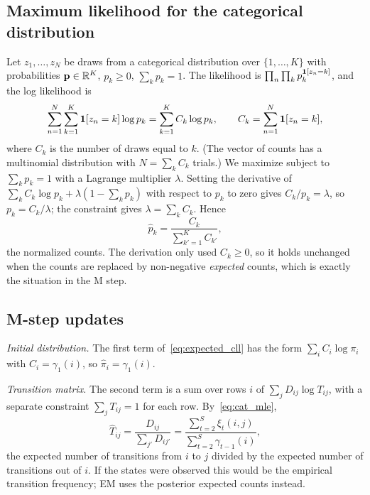 \subsection{Maximum likelihood for the categorical distribution}

Let $z_1,\dots,z_N$ be draws from a categorical distribution over $\{1,\dots,K\}$ with probabilities $\mathbf{p}\in\mathbb{R}^K$, $p_k\geq 0$, $\sum_k p_k=1$. The likelihood is $\prod_n\prod_k p_k^{\mathbf{1}[z_n=k]}$, and the log likelihood is
\begin{equation}
  \sum_{n=1}^N\sum_{k=1}^K\mathbf{1}[z_n=k]\log p_k = \sum_{k=1}^K C_k\log p_k, \qquad C_k = \sum_{n=1}^N\mathbf{1}[z_n=k],
\end{equation}
where $C_k$ is the number of draws equal to $k$. (The vector of counts has a multinomial distribution with $N=\sum_k C_k$ trials.) We maximize subject to $\sum_k p_k=1$ with a Lagrange multiplier $\lambda$. Setting the derivative of $\sum_k C_k\log p_k+\lambda\left(1-\sum_k p_k\right)$ with respect to $p_k$ to zero gives $C_k/p_k=\lambda$, so $p_k=C_k/\lambda$; the constraint gives $\lambda=\sum_k C_k$. Hence
\begin{equation}
  \hat p_k = \frac{C_k}{\sum_{k'=1}^K C_{k'}},
  \label{eq:cat_mle}
\end{equation}
the normalized counts. The derivation only used $C_k\geq 0$, so it holds unchanged when the counts are replaced by non-negative \emph{expected} counts, which is exactly the situation in the M step.

\subsection{M-step updates}

\emph{Initial distribution.} The first term of~\eqref{eq:expected_cll} has the form $\sum_i C_i\log\pi_i$ with $C_i=\gamma_1(i)$, so $\hat\pi_i=\gamma_1(i)$.

\emph{Transition matrix.} The second term is a sum over rows $i$ of $\sum_j D_{ij}\log T_{ij}$, with a separate constraint $\sum_j T_{ij}=1$ for each row. By~\eqref{eq:cat_mle},
\begin{equation}
  \hat T_{ij} = \frac{D_{ij}}{\sum_{j'}D_{ij'}} = \frac{\sum_{t=2}^S\xi_t(i,j)}{\sum_{t=2}^S\gamma_{t-1}(i)},
\end{equation}
the expected number of transitions from $i$ to $j$ divided by the expected number of transitions out of $i$. If the states were observed this would be the empirical transition frequency; EM uses the posterior expected counts instead.

